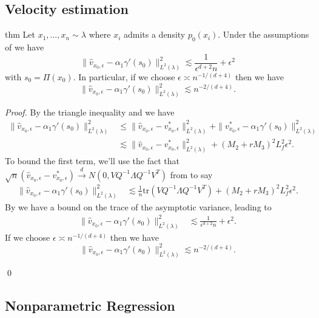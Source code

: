\documentclass[11pt]{article}
\begin{document}
\subsection{Velocity estimation}
\begin{restatable}{thm}{} \label{thm: velocity risk}
    Let $x_1, \dots, x_n \sim \lambda$ where $x_i$ admits a density $p_0(x_i)$. Under the assumptions of  we have
    \[\|\hat{v}_{x_0, \epsilon} - \alpha_1\gamma'(s_0)\|_{L^2(\lambda)}^2 \lesssim \frac{1}{\epsilon^{d+2}n} + \epsilon^2 \]
    with $s_0 = \Pi(x_0)$. In particular, if we choose $\epsilon \asymp n^{-1/(d+4)}$ then we have
    \[\|\hat{v}_{x_0, \epsilon} - \alpha_1\gamma'(s_0)\|_{L^2(\lambda)}^2 \lesssim n^{-2/(d+4)}. \]
\end{restatable}
\noindent \textit{Proof.} By the triangle inequality and  we have
\begin{align}
    \|\hat{v}_{x_0, \epsilon} - \alpha_1\gamma'(s_0)\|_{L^2(\lambda)}^2 &\leq \|\hat{v}_{x_0, \epsilon} - v^*_{x_0, \epsilon} \|_{L^2(\lambda)}^2 + \|v^*_{x_0, \epsilon}  - \alpha_1\gamma'(s_0)\|_{L^2(\lambda)}^2 \\
    &\lesssim  \|\hat{v}_{x_0, \epsilon} - v^*_{x_0, \epsilon} \|_{L^2(\lambda)}^2 + (M_2 + rM_3)^2L_f^2\epsilon^2.
\end{align}
To bound the first term, we'll use the fact that $\sqrt{n}(\hat{v}_{x_0, \epsilon} - v^*_{x_0, \epsilon}) \overset{d}{\rightarrow}N(0, VQ^{-1}\Lambda Q^{-1}V^T)$ from  to say
\begin{align}
    \|\hat{v}_{x_0, \epsilon} - \alpha_1\gamma'(s_0)\|_{L^2(\lambda)}^2
    &\lesssim  \frac{1}{n}\text{tr}\left( VQ^{-1}\Lambda Q^{-1}V^T\right) + (M_2 + rM_3)^2L_f^2\epsilon^2.
\end{align}
By  we have a bound on the trace of the asymptotic variance, leading to
\begin{align}
    \|\hat{v}_{x_0, \epsilon} - \alpha_1\gamma'(s_0)\|_{L^2(\lambda)}^2
    &\lesssim  \frac{1}{\epsilon^{d+2}n} + \epsilon^2.
\end{align}
If we choose $\epsilon \asymp n^{-1/(d+4)}$ then we have
\[\|\hat{v}_{x_0, \epsilon} - \alpha_1\gamma'(s_0)\|_{L^2(\lambda)}^2 \lesssim n^{-2/(d+4)}. \]

\qed{}

\subsection{Nonparametric Regression}
\end{document}
